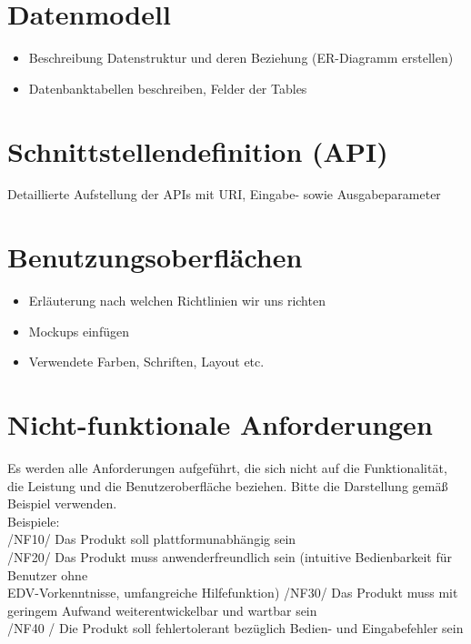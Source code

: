 \documentclass[%
	ngerman,
	12pt,
	a4paper,
	oneside,
	parskip=full
]{scrbook}
\begin{document}
\chapter{Datenmodell}
\begin{itemize}
	\item Beschreibung Datenstruktur und deren Beziehung (ER-Diagramm erstellen)
	\item Datenbanktabellen beschreiben, Felder der Tables
\end{itemize}

\chapter{Schnittstellendefinition (API)}
Detaillierte Aufstellung der APIs mit URI, Eingabe- sowie Ausgabeparameter

\chapter{Benutzungsoberflächen}
\begin{itemize}
	\item Erläuterung nach welchen Richtlinien wir uns richten
	\item Mockups einfügen
	\item Verwendete Farben, Schriften, Layout etc.
\end{itemize}

\chapter{Nicht-funktionale Anforderungen}
Es werden alle Anforderungen aufgeführt, die sich nicht auf die Funktionalität, die Leistung
und die Benutzeroberfläche beziehen.
Bitte die Darstellung gemäß Beispiel verwenden.\\
Beispiele:\\
/NF10/ Das Produkt soll plattformunabhängig sein \\
/NF20/ Das Produkt muss anwenderfreundlich sein (intuitive Bedienbarkeit für Benutzer ohne\\
EDV-Vorkenntnisse, umfangreiche Hilfefunktion)
/NF30/ Das Produkt muss mit geringem Aufwand weiterentwickelbar und wartbar sein\\
/NF40 / Die Produkt soll fehlertolerant bezüglich Bedien- und Eingabefehler sein\\
\end{document}
